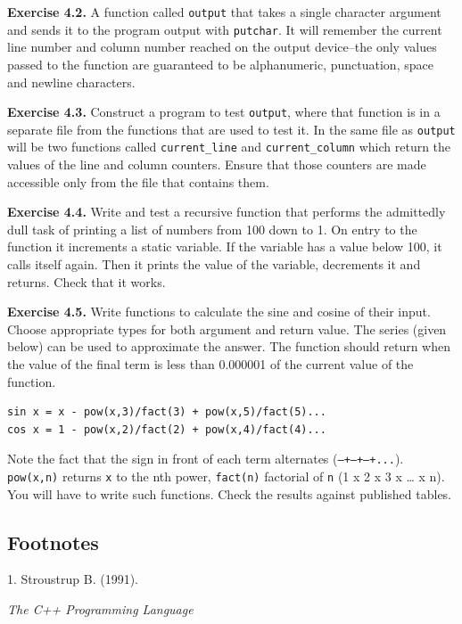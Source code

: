   \textbf{Exercise 4.2.} A function called \texttt{output} that takes a
   single character argument and sends it to the program output with
   \texttt{putchar}. It will remember the current line number and column
   number reached on the output device--the only values passed to the
   function are guaranteed to be alphanumeric, punctuation, space and
   newline characters.


  \textbf{Exercise 4.3.} Construct a program to test \texttt{output}, where
   that function is in a separate file from the functions that are used to
   test it. In the same file as \texttt{output} will be two functions
   called \texttt{current\_line} and \texttt{current\_column} which
   return the values of the line and column counters. Ensure that those
   counters are made accessible only from the file that contains
   them.


  \textbf{Exercise 4.4.} Write and test a recursive function that performs the
   admittedly dull task of printing a list of numbers from 100 down to 1. On
   entry to the function it increments a static variable. If the variable
   has a value below 100, it calls itself again. Then it prints the value of
   the variable, decrements it and returns. Check that it works.


  \textbf{Exercise 4.5.} Write functions to calculate the sine and cosine of their input.
    Choose appropriate types for both argument and return value. The series
    (given below) can be used to approximate the answer. The function should
    return when the value of the final term is less than 0.000001 of the
    current value of the function.

\begin{Verbatim}
sin x = x - pow(x,3)/fact(3) + pow(x,5)/fact(5)...
cos x = 1 - pow(x,2)/fact(2) + pow(x,4)/fact(4)...
\end{Verbatim}
Note the fact that the sign in front of each term alternates
    (\texttt{--+--+--+...}). \texttt{pow(x,n)} returns
    \texttt{x} to the nth power, \texttt{fact(n)}
    factorial of \texttt{n} (1 x 2 x 3 x \ldots 
    x n). You will have to write such functions. Check the
    results against published tables.


 \subsection{Footnotes}1. Stroustrup
     B. (1991). \begin{center}\textit{The C++ Programming Language}\end{center}

